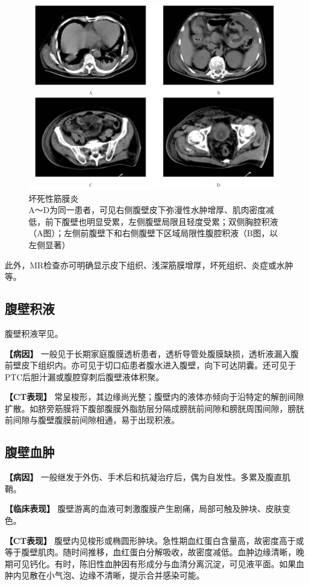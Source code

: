 \begin{figure}[!htbp]
 \centering
 \includegraphics[width=.7\textwidth,height=\textheight,keepaspectratio]{./images/Image00378.jpg}
 \captionsetup{justification=centering}
 \caption{坏死性筋膜炎\\{\small A～D为同一患者，可见右侧腹壁皮下弥漫性水肿增厚、肌肉密度减低，前下腹壁也明显受累，左侧腹壁局限且轻度受累；双侧胸腔积液（A图）；左侧前腹壁下和右侧腹壁下区域局限性腹腔积液（B图，以左侧显著）}}
 \label{fig18-8}
  \end{figure} 

此外，MR检查亦可明确显示皮下组织、浅深筋膜增厚，坏死组织、炎症或水肿等。

\subsection{腹壁积液}

腹壁积液罕见。

\textbf{【病因】}
一般见于长期家庭腹膜透析患者，透析导管处腹膜缺损，透析液漏入腹前壁皮下组织内。亦可见于切口疝患者腹水进入腹壁，向下可达阴囊。还可见于PTC后胆汁漏或腹腔穿刺后腹壁液体积聚。

\textbf{【CT表现】}
常呈梭形，其边缘尚光整；腹壁内的液体亦倾向于沿特定的解剖间隙扩散。如脐旁筋膜将下腹部腹膜外脂肪层分隔成膀胱前间隙和膀胱周围间隙，膀胱前间隙与腹壁腹膜前间隙相通，易于出现积液。

\subsection{腹壁血肿}

\textbf{【病因】}
一般继发于外伤、手术后和抗凝治疗后，偶为自发性。多累及腹直肌鞘。

\textbf{【临床表现】}
腹壁游离的血液可刺激腹膜产生剧痛，局部可触及肿块、皮肤变色。

\textbf{【CT表现】}
腹壁内见梭形或椭圆形肿块。急性期血红蛋白含量高，故密度高于或等于腹壁肌肉。随时间推移，血红蛋白分解吸收，故密度减低。血肿边缘清晰，晚期可见钙化。有时，陈旧性血肿因有形成分与血清分离沉淀，可见液平面。如果血肿内见散在小气泡、边缘不清晰，提示合并感染可能。


